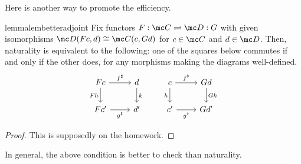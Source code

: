 \documentclass[../notes.tex]{subfiles}
\begin{document}
Here is another way to promote the efficiency.
\begin{restatable}{lemma}{lembetteradjoint} \label{lem:betteradjoint}
	Fix functors $F:\mc C\rightleftharpoons\mc D:G$ with given isomorphisms $\mc D(Fc,d)\cong\mc C(c,Gd)$ for $c\in\mc C$ and $d\in\mc D$. Then, naturality is equivalent to the following: one of the squares below commutes if and only if the other does, for any morphisms making the diagrams well-defined.
	\[\begin{tikzcd}[ampersand replacement=\&]
		Fc \& d \& c \& Gd \\
		{Fc'} \& {d'} \& {c'} \& {Gd'}
		\arrow["{f^\sharp}", from=1-1, to=1-2]
		\arrow["{g^\sharp}"', from=2-1, to=2-2]
		\arrow["Fh"', from=1-1, to=2-1]
		\arrow["k", from=1-2, to=2-2]
		\arrow["h"', from=1-3, to=2-3]
		\arrow["{f^\flat}", from=1-3, to=1-4]
		\arrow["{g^\flat}"', from=2-3, to=2-4]
		\arrow["Gk", from=1-4, to=2-4]
	\end{tikzcd}\]
\end{restatable}
\begin{proof}
	This is supposedly on the homework.
\end{proof}
In general, the above condition is better to check than naturality.
\end{document}
